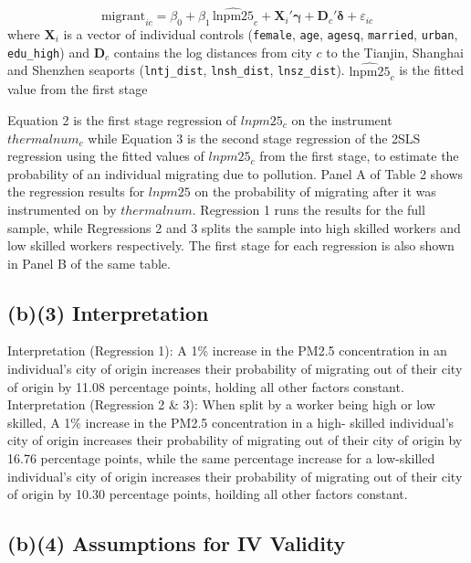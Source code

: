 \documentclass[11pt]{article}
\begin{document}
\begin{equation}
\label{eq:ols}
\text{migrant}_{ic} = \beta_0 + \beta_1 \,\widehat{\text{lnpm25}}_c + \mathbf{X}_i'\boldsymbol{\gamma} + \mathbf{D}_c'\boldsymbol{\delta} + \varepsilon_{ic}\end{equation}
where $\mathbf{X}_i$ is a vector of individual controls (\texttt{female}, \texttt{age}, \texttt{agesq}, \texttt{married}, \texttt{urban}, \texttt{edu\_high}) and $\mathbf{D}_c$ contains the log distances from city $c$ to the Tianjin, Shanghai and Shenzhen seaports (\texttt{lntj\_dist}, \texttt{lnsh\_dist}, \texttt{lnsz\_dist}). $\widehat{\text{lnpm25}}_c$ is the fitted value from the first stage

\noindent Equation 2 is the first stage regression of $lnpm25_c$ on the instrument $thermalnum_c$ while Equation 3 is the second stage regression of the 2SLS regression using the fitted values of $lnpm25_c$ from the first stage, to estimate the probability of an individual migrating due to pollution. Panel A of Table 2 shows the regression results for $lnpm25$ on the probability of migrating after it was instrumented on by $thermalnum$. Regression 1 runs the results for the full sample, while Regressions 2 and 3 splits the sample into high skilled workers and low skilled workers respectively. The first stage for each regression is also shown in Panel B of the same table.

\subsection*{(b)(3) Interpretation}
\noindent Interpretation (Regression 1): A 1\% increase in the PM2.5 concentration in an individual's city of origin increases their probability of migrating out of their city of origin by 11.08 percentage points, holding all other factors constant.\\

\noindent Interpretation (Regression 2 \& 3): When split by a worker being high or low skilled, A 1\% increase in the PM2.5 concentration in a high- skilled individual's city of origin increases their probability of migrating out of their city of origin by 16.76 percentage points, while the same percentage increase for a low-skilled individual's city of origin increases their probability of migrating out of their city of origin by 10.30 percentage points, hoilding all other factors constant.\\

\subsection*{(b)(4) Assumptions for IV Validity}
\end{document}

